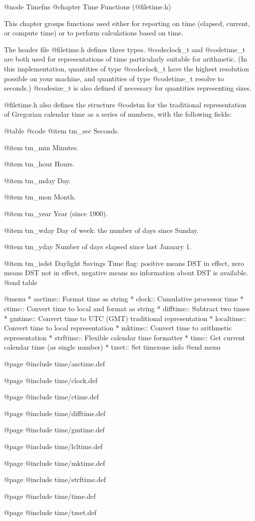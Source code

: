 @node Timefns
@chapter Time Functions (@file{time.h})

This chapter groups functions used either for reporting on time
(elapsed, current, or compute time) or to perform calculations based
on time.

The header file @file{time.h} defines three types.  @code{clock_t} and
@code{time_t} are both used for representations of time particularly
suitable for arithmetic.  (In this implementation, quantities of type
@code{clock_t} have the highest resolution possible on your machine,
and quantities of type @code{time_t} resolve to seconds.)  @code{size_t}
is also defined if necessary for quantities representing sizes. 

@file{time.h} also defines the structure @code{tm} for the traditional
representation of Gregorian calendar time as a series of numbers, with
the following fields: 

@table @code
@item tm_sec
Seconds.

@item tm_min
Minutes.

@item tm_hour
Hours.

@item tm_mday
Day.

@item tm_mon
Month.

@item tm_year
Year (since 1900).

@item tm_wday
Day of week: the number of days since Sunday.

@item tm_yday
Number of days elapsed since last January 1.

@item tm_isdst
Daylight Savings Time flag: positive means DST in effect, zero means DST
not in effect, negative means no information about DST is available.
@end table

@menu
* asctime::     Format time as string
* clock::       Cumulative processor time
* ctime::       Convert time to local and format as string
* difftime::    Subtract two times
* gmtime::      Convert time to UTC (GMT) traditional representation
* localtime::   Convert time to local representation
* mktime::      Convert time to arithmetic representation
* strftime::    Flexible calendar time formatter
* time::        Get current calendar time (as single number)
* tzset::       Set timezone info
@end menu

@page
@include time/asctime.def

@page
@include time/clock.def

@page
@include time/ctime.def

@page
@include time/difftime.def

@page
@include time/gmtime.def

@page
@include time/lcltime.def

@page
@include time/mktime.def

@page
@include time/strftime.def

@page
@include time/time.def

@page
@include time/tzset.def
